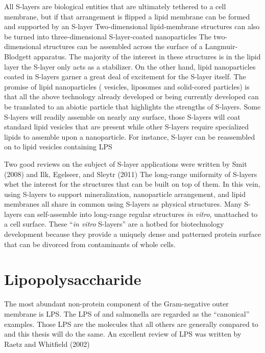   All \acp{S-layer} are biological entities that are ultimately tethered to a cell membrane, but if that arrangement is flipped a lipid membrane can be formed and supported by an
\ac{S-layer} Two-dimensional lipid-membrane structures can also be turned into three-dimensional \ac{S-layer}-coated
nanoparticles The two-dimensional structures can be assembled across the surface of a Langmuir-Blodgett apparatus. The majority of the interest in
these structures is in the lipid layer the \ac{S-layer} only acts as a stabilizer. On the other hand, lipid nanoparticles coated in \acp{S-layer} garner a
great deal of excitement for the \ac{S-layer} itself. The promise of lipid nanoparticles (\ie{} vesicles, liposomes and solid-cored particles) is that all the above technology
already developed or being currently developed can be translated to an abiotic particle that highlights the strengths of \acp{S-layer}. Some \acp{S-layer} will readily assemble on
nearly any surface, those \acp{S-layer} will coat standard lipid vesicles that are present while other \acp{S-layer} require specialized lipids to assemble
upon a nanoparticle. For instance, \caulobacter \ac{S-layer} can be reassembled on to lipid vesicles containing \caulobacter{} \ac{LPS}
  
  Two good reviews on the subject of \ac{S-layer} applications were written by Smit (2008) and Ilk, Egelseer, and Sleytr (2011)  The
long-range uniformity of \acp{S-layer} whet the interest for the structures that can be built on top of them. In this vein, using \acp{S-layer} to support mineralization,
nanoparticle arrangement, and lipid membranes all share in common using \acp{S-layer} as physical structures.  Many \acp{S-layer} can self-assemble into long-range regular
structures \textit{in vitro}, unattached to a cell surface. These ``\textit{in vitro} \acp{S-layer}'' are a hotbed for biotechnology development because they provide a uniquely
dense and patterned protein surface that can be divorced from contaminants of whole cells. %

\section{Lipopolysaccharide}\label{sec:intro-lps} %
 The most abundant non-protein component of the Gram-negative
outer membrane is \ac{LPS}. The \ac{LPS} of \ecoli and \acl{salmonella} are regarded as the ``canonical'' examples. Those \ac{LPS} are the molecules that all others are generally
compared to and this thesis will do the same. An excellent review of \ac{LPS} was written by Raetz and Whitfield (2002)

